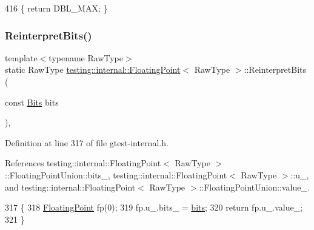 \begin{DoxyCode}
416 \{ \textcolor{keywordflow}{return} DBL\_MAX; \}
\end{DoxyCode}
\mbox{\label{classtesting_1_1internal_1_1FloatingPoint_ac551f793522e54fbd8a25acb79eac5b1}} 
\subsubsection{\texorpdfstring{Reinterpret\+Bits()}{ReinterpretBits()}}
{\footnotesize\ttfamily template$<$typename Raw\+Type$>$ \\
static Raw\+Type \hyperlink{classtesting_1_1internal_1_1FloatingPoint}{testing\+::internal\+::\+Floating\+Point}$<$ Raw\+Type $>$\+::Reinterpret\+Bits (\begin{DoxyParamCaption}\item[{const \hyperlink{classtesting_1_1internal_1_1FloatingPoint_abf228bf6cd48f12c8b44c85b4971a731}{Bits}}]{bits }\end{DoxyParamCaption})\hspace{0.3cm}{\ttfamily [inline]}, {\ttfamily [static]}}



Definition at line 317 of file gtest-\/internal.\+h.



References testing\+::internal\+::\+Floating\+Point$<$ Raw\+Type $>$\+::\+Floating\+Point\+Union\+::bits\+\_\+, testing\+::internal\+::\+Floating\+Point$<$ Raw\+Type $>$\+::u\+\_\+, and testing\+::internal\+::\+Floating\+Point$<$ Raw\+Type $>$\+::\+Floating\+Point\+Union\+::value\+\_\+.


\begin{DoxyCode}
317                                                   \{
318     \hyperlink{classtesting_1_1internal_1_1FloatingPoint_a0dabf840863e0df84046f171c891fe71}{FloatingPoint} fp(0);
319     fp.u\_.bits\_ = \hyperlink{classtesting_1_1internal_1_1FloatingPoint_aab053be914bdc9e507c0db89740c318c}{bits};
320     \textcolor{keywordflow}{return} fp.u\_.value\_;
321   \}
\end{DoxyCode}
\mbox{\label{classtesting_1_1internal_1_1FloatingPoint_afb8a816bb598225d775caaf43a893ef0}} 
